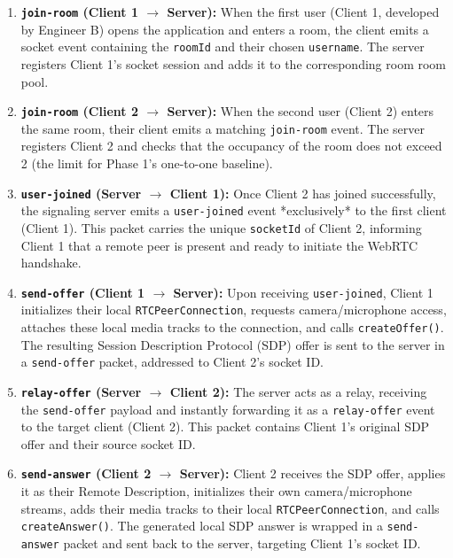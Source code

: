 \documentclass[11pt,a4paper]{article}
\begin{document}
\begin{enumerate}
    \item \textbf{\texttt{join-room} (Client 1 $\rightarrow$ Server):} 
    When the first user (Client 1, developed by Engineer B) opens the application and enters a room, the client emits a socket event containing the \texttt{roomId} and their chosen \texttt{username}. The server registers Client 1's socket session and adds it to the corresponding room room pool.
    
    \item \textbf{\texttt{join-room} (Client 2 $\rightarrow$ Server):} 
    When the second user (Client 2) enters the same room, their client emits a matching \texttt{join-room} event. The server registers Client 2 and checks that the occupancy of the room does not exceed 2 (the limit for Phase 1's one-to-one baseline).
    
    \item \textbf{\texttt{user-joined} (Server $\rightarrow$ Client 1):} 
    Once Client 2 has joined successfully, the signaling server emits a \texttt{user-joined} event *exclusively* to the first client (Client 1). This packet carries the unique \texttt{socketId} of Client 2, informing Client 1 that a remote peer is present and ready to initiate the WebRTC handshake.
    
    \item \textbf{\texttt{send-offer} (Client 1 $\rightarrow$ Server):} 
    Upon receiving \texttt{user-joined}, Client 1 initializes their local \texttt{RTCPeerConnection}, requests camera/microphone access, attaches these local media tracks to the connection, and calls \texttt{createOffer()}. The resulting Session Description Protocol (SDP) offer is sent to the server in a \texttt{send-offer} packet, addressed to Client 2's socket ID.
    
    \item \textbf{\texttt{relay-offer} (Server $\rightarrow$ Client 2):} 
    The server acts as a relay, receiving the \texttt{send-offer} payload and instantly forwarding it as a \texttt{relay-offer} event to the target client (Client 2). This packet contains Client 1's original SDP offer and their source socket ID.
    
    \item \textbf{\texttt{send-answer} (Client 2 $\rightarrow$ Server):} 
    Client 2 receives the SDP offer, applies it as their Remote Description, initializes their own camera/microphone streams, adds their media tracks to their local \texttt{RTCPeerConnection}, and calls \texttt{createAnswer()}. The generated local SDP answer is wrapped in a \texttt{send-answer} packet and sent back to the server, targeting Client 1's socket ID.
    

\end{enumerate}
\end{document}
